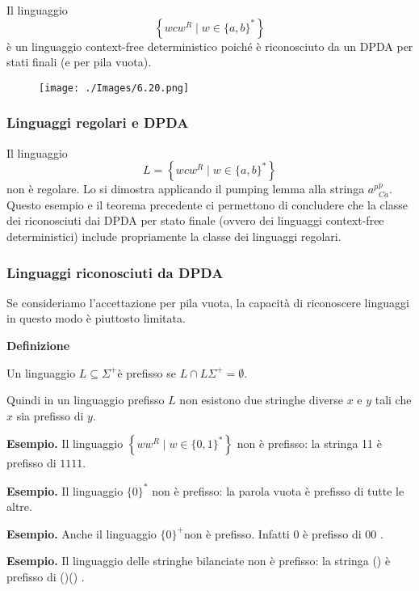 Il linguaggio
$$
\left\{w c w^{R} \mid w \in\{a, b\}^{*}\right\}
$$
è un linguaggio context-free deterministico poiché è riconosciuto da un DPDA per stati finali (e per pila vuota).

\begin{figure}[hbpt!]
    \centering
    \texttt{[image: ./Images/6.20.png]}
\end{figure}
\FloatBarrier

\subsubsection{Linguaggi regolari e DPDA}

Il linguaggio
$$
L=\left\{w c w^{R} \mid w \in\{a, b\}^{*}\right\}
$$
non è regolare. Lo si dimostra applicando il pumping lemma alla stringa $a^{p}{ }_{C a}^{p}$.
Questo esempio e il teorema precedente ci permettono di concludere che la classe dei riconosciuti dai DPDA per stato finale (ovvero dei linguaggi context-free deterministici) include propriamente la classe dei linguaggi regolari.

\subsubsection{Linguaggi riconosciuti da DPDA}

Se consideriamo l'accettazione per pila vuota, la capacità di riconoscere linguaggi in questo modo è piuttosto limitata.

\textbf{Definizione}

Un linguaggio $L \subseteq \Sigma^{+}$è prefisso se $L \cap L \Sigma^{+}=\emptyset$.

Quindi in un linguaggio prefisso $L$ non esistono due stringhe diverse $x$ e $y$ tali che $x$ sia prefisso di $y$.

\vspace{5mm}

\textbf{Esempio.} Il linguaggio $\left\{w w^{R} \mid w \in\{0,1\}^{*}\right\}$ non è prefisso: la stringa 11 è prefisso di $1111 .$

\textbf{Esempio. }Il linguaggio $\{0\}^{*}$ non è prefisso: la parola vuota è prefisso di tutte le altre.

\textbf{Esempio.} Anche il linguaggio $\{0\}^{+}$non è prefisso. Infatti 0 è prefisso di 00 .

\textbf{Esempio. }Il linguaggio delle stringhe bilanciate non è prefisso: la stringa () è prefisso di ()() .

\vspace{5mm}

